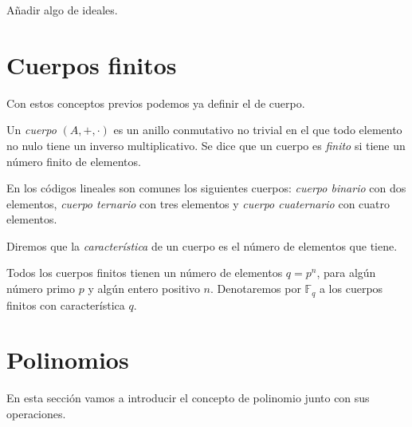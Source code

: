 Añadir algo de ideales.


    


\section{Cuerpos finitos}

Con estos conceptos previos podemos ya definir el de cuerpo.

\begin{definition}
    Un \emph{cuerpo} $(A, +, \cdot )$ es un anillo conmutativo no trivial en el que todo elemento no nulo tiene un inverso multiplicativo.
    Se dice que un cuerpo es \emph{finito} si tiene un número finito de elementos.
\end{definition}

En los códigos lineales son comunes los siguientes cuerpos: \emph{cuerpo binario} con dos elementos, 
\emph{cuerpo ternario} con tres elementos y \emph{cuerpo cuaternario} con cuatro elementos.

Diremos que la \emph{característica} de un cuerpo es el número de elementos que tiene.

Todos los cuerpos finitos tienen un número de elementos $q = p^n$, para algún número primo $p$ y algún entero positivo $n$.
Denotaremos por $\mathbb{F}_q$ a los cuerpos finitos con característica $q$.


\section{Polinomios}

En esta sección vamos a introducir el concepto de polinomio junto con sus operaciones.

